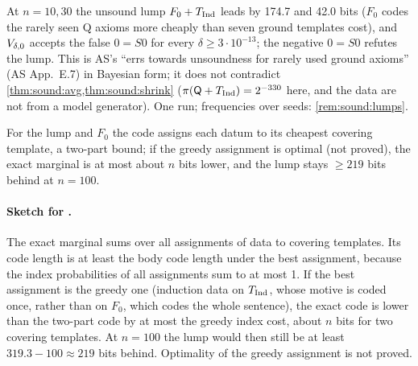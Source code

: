 \begin{remark}\pabrk{}\label{rem:pa:lumps}
At $n=10,30$ the unsound lump $F_0+T_{\mathrm{Ind}}$ leads by 174.7 and 42.0 bits ($F_0$ codes the rarely seen Q axioms more cheaply than seven ground templates cost), and $V_{\delta,0}$ accepts the false $0=S0$ for every $\delta\ge3\cdot10^{-13}$; the negative $0=S0$ refutes the lump. This is AS's ``errs towards unsoundness for rarely used ground axioms'' (AS App.~E.7) in Bayesian form; it does not contradict \cref{thm:sound:avg,thm:sound:shrink} ($\pi(\mathsf{Q}+T_{\mathrm{Ind}})=2^{-330}$ here, and the data are not from a model generator). One run; frequencies over seeds: \cref{rem:sound:lumps}.
\end{remark}

\begin{remark}\pabrk{}\label{rem:pa:overlap}
For the lump and $F_0$ the code assigns each datum to its cheapest covering template, a two-part bound; if the greedy assignment is optimal (not proved), the exact marginal is at most about $n$ bits lower, and the lump stays $\ge219$ bits behind at $n=100$.
\end{remark}

\paragraph{Sketch for .} The exact marginal sums over all assignments of data to covering templates. Its code length is at least the body code length under the best assignment, because the index probabilities of all assignments sum to at most 1. If the best assignment is the greedy one (induction data on $T_{\mathrm{Ind}}$, whose motive is coded once, rather than on $F_0$, which codes the whole sentence), the exact code is lower than the two-part code by at most the greedy index cost, about $n$ bits for two covering templates. At $n=100$ the lump would then still be at least $319.3-100\approx219$ bits behind. Optimality of the greedy assignment is not proved.

